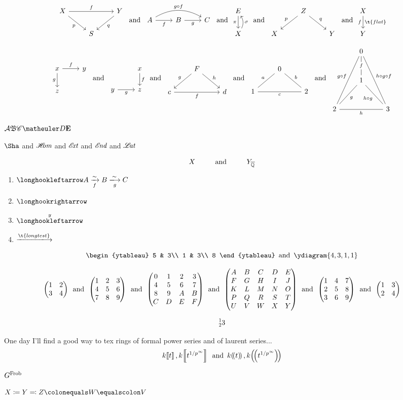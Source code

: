 \documentclass{article}
\numberwithin{thm}{section}
\numberwithin{prob}{section}
\numberwithin{equation}{section}
\begin{document}
$$\mapover XfYpqS\tand\compdiag AfBgC{g\circ f}\tand\mapwithsect E\pi X\sigma\tand\correspondence ZpqXY\tand\mapdown Xf{\t{flat}}Y$$

\[\topcorner xfygz\tand\botcorner xfygz\tand\conediag Fghcfd\tand\midtwosimplex 0ab1c2\tand\frontthreesimplex0{g\circ f}f{h\circ g\circ f}1g{h\circ g}2h3\]

$\mcA\mf B\msC\meD\mbf E$

$\Sha$ and $\sHom$ and $\sExt$ and $\sEnd$ and $\sLat$

$$X\Text{and}\sspacing Y_\Qbar$$

\begin{enumerate}
    \item  $\fintoo A\xiso fB\xisoo gC$
    \item  $\intoo$
    \item $\xfintoo{y}$
    \item $\xlongrightarrow{\t{long test}}$
\end{enumerate}
$$\begin{ytableau}
    5 & 3\\
    1 & 3\\
    8
\end{ytableau}\tand\ydiagram{4,3,1,1}$$

$$\mat1234\tand\Mat123456789\tand\MAT0123456789ABCDEF\tand\Matrix ABCDEFGHIJKLMNOPQRSTUVWXY\tand\Matt123456789\tand\matt1234$$

$$\prescript123$$

One day I'll find a good way to tex rings of formal power series and of laurent series...
$$k\dsq t,k\dsq{t^{1/p^\infty}}\tand k\dparens t,k\dparens{t^{1/p^\infty}}$$

$G^\Frob$

$X\coloneqq Y\eqqcolon Z\colonequals W\equalscolon V$
\end{document}
